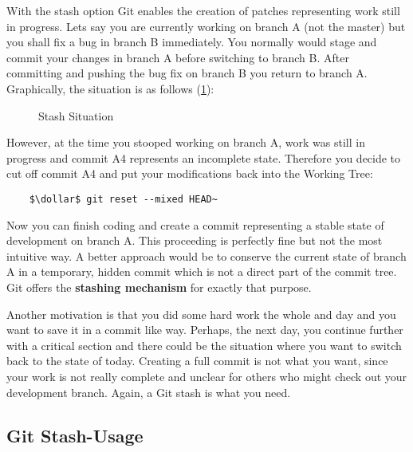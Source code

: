 With the stash option Git enables the creation of patches representing work still in progress. Lets say you are currently 
working on branch A (not the master) but you shall fix a bug in branch B immediately. You normally would stage and commit 
your changes in branch A before switching to branch B. After committing and pushing the bug fix on branch B you return 
to branch A. Graphically, the situation is as follows (\cref{fig:StashSituation}):
\begin{figure}[H]
	\centering
	
	\caption{Stash Situation}
	\label{fig:StashSituation}
\end{figure}
However, at the time you stooped working on branch A, work was still in progress and commit A4 represents an incomplete 
state. Therefore you decide to cut off commit A4 and put your modifications back into the Working Tree:
\begin{lstlisting}
	$\dollar$ git reset --mixed HEAD~
\end{lstlisting} 
Now you can finish coding and create a commit representing a stable state of development on branch A.
This proceeding is perfectly fine but not the most intuitive way. A better approach would be to conserve 
the current state of branch A in a temporary, hidden commit which is not a direct part of the commit tree.
Git offers the \textbf{stashing mechanism} for exactly that purpose. 


Another motivation is that you did some hard work the whole and day and you want to save it in a commit like way.
Perhaps, the next day, you continue further with a critical section and there could be the situation where you 
want to switch back to the state of today. Creating a full commit is not what you want, since your work is not 
really complete and unclear for others who might check out your development branch. Again, a Git stash is what 
you need.

\subsection*{Git Stash-Usage}

